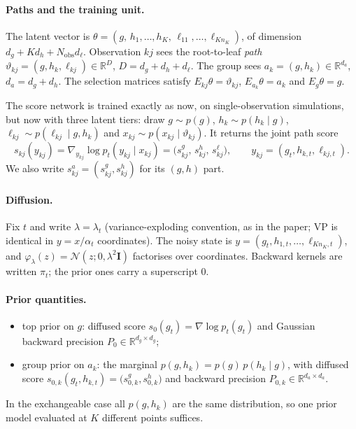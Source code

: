 \documentclass[11pt]{article}
\theoremstyle{definition}
\theoremstyle{remark}
\newcommand{\R}{\mathbb{R}}
\newcommand{\N}{\mathcal{N}}
\newcommand{\I}{\mathbf{I}}
\newcommand{\lam}{\lambda}
\newcommand{\hk}{h_k}
\newcommand{\lkj}{\ell_{kj}}
\newcommand{\ak}{a_k}          %
\newcommand{\vkj}{\vartheta_{kj}} %
\begin{document}
\paragraph{Paths and the training unit.}
The latent vector is $\theta=(g,\,h_1,\dots,h_K,\,\ell_{11},\dots,\ell_{Kn_K})$,
of dimension $d_g+Kd_h+N_\text{obs}d_\ell$. Observation $kj$ sees the root-to-leaf
\emph{path} $\vkj=(g,\hk,\lkj)\in\R^{D}$, $D=d_g+d_h+d_\ell$. The group sees
$\ak=(g,\hk)\in\R^{d_a}$, $d_a=d_g+d_h$. The selection matrices satisfy
$E_{kj}\theta=\vkj$, $E_{\ak}\theta=\ak$ and $E_g\theta=g$.

The score network is trained exactly as now, on single-observation simulations,
but now with three latent tiers: draw $g\sim p(g)$, $\hk\sim p(\hk\mid g)$,
$\lkj\sim p(\lkj\mid g,\hk)$ and $x_{kj}\sim p(x_{kj}\mid\vkj)$. It returns the
joint path score
\begin{equation}\label{eq:network}
s_{kj}(y_{kj})=\nabla_{y_{kj}}\log p_t(y_{kj}\mid x_{kj})=\big(s^g_{kj},\,s^h_{kj},\,s^\ell_{kj}\big),\qquad y_{kj}=(g_t,h_{k,t},\ell_{kj,t}).
\end{equation}
We also write $s^a_{kj}=(s^g_{kj},s^h_{kj})$ for its $(g,h)$ part.

\paragraph{Diffusion.}
Fix $t$ and write $\lam=\lam_t$ (variance-exploding convention, as in the paper;
VP is identical in $y=x/\alpha_t$ coordinates). The noisy state is
$y=(g_t,h_{1,t},\dots,\ell_{Kn_K,t})$, and $\varphi_\lam(z)=\N(z;0,\lam^2\I)$
factorises over coordinates. Backward kernels are written $\pi_t$; the prior
ones carry a superscript $0$.

\paragraph{Prior quantities.}
\begin{itemize}
\item top prior on $g$: diffused score $s_0(g_t)=\nabla\log p_t(g_t)$ and
 Gaussian backward precision $P_0\in\R^{d_g\times d_g}$;
\item group prior on $\ak$: the marginal $p(g,\hk)=p(g)\,p(\hk\mid g)$, with
 diffused score $s_{0,k}(g_t,h_{k,t})=\big(s^g_{0,k},s^h_{0,k}\big)$ and backward
 precision $P_{0,k}\in\R^{d_a\times d_a}$.
\end{itemize}
In the exchangeable case all $p(g,\hk)$ are the same distribution, so one prior
model evaluated at $K$ different points suffices.
\end{document}
